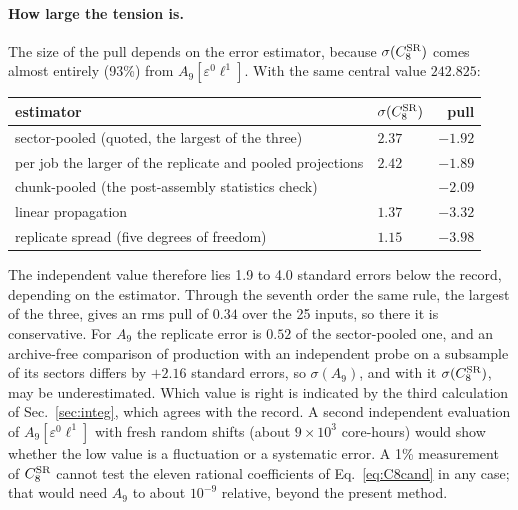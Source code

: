 \documentclass[11pt,a4paper]{article}
\numberwithin{equation}{section}
\newcommand{\CSR}{C^{\rm SR}}
\newcommand{\sci}[2]{#1\times10^{#2}}
\begin{document}
\paragraph{How large the tension is.} The size of the pull depends on the error estimator, because $\sigma(\CSR_8)$
comes almost entirely (93\%) from $A_9[\varepsilon^0\ell^1]$. With the same central value $242.825$:
\begin{center}\small
\begin{tabular}{@{}llr@{}}
\toprule
estimator & $\sigma(\CSR_8)$ & pull\\
\midrule
sector-pooled (quoted, the largest of the three) & $2.37$ & $-1.92$\\
per job the larger of the replicate and pooled projections & $2.42$ & $-1.89$\\
chunk-pooled (the post-assembly statistics check) & & $-2.09$\\
linear propagation & $1.37$ & $-3.32$\\
replicate spread (five degrees of freedom) & $1.15$ & $-3.98$\\
\bottomrule
\end{tabular}
\end{center}
The independent value therefore lies 1.9 to 4.0 standard errors below the record, depending on the estimator. Through
the seventh order the same rule, the largest of the three, gives an rms pull of $0.34$ over the 25 inputs, so there it
is conservative. For $A_9$ the replicate error is $0.52$ of the sector-pooled one, and an archive-free comparison of
production with an independent probe on a subsample of its sectors differs by $+2.16$ standard errors, so
$\sigma(A_9)$, and with it $\sigma(\CSR_8)$, may be underestimated. Which value is right is indicated by the third
calculation of Sec.~\ref{sec:integ}, which agrees with the record. A second independent evaluation of
$A_9[\varepsilon^0\ell^1]$ with fresh random shifts (about $\sci{9}{3}$ core-hours) would show whether the low value
is a fluctuation or a systematic error. A 1\%
measurement of $\CSR_8$ cannot test the eleven rational coefficients of Eq.~\eqref{eq:C8cand} in any case; that would
need $A_9$ to about $10^{-9}$ relative, beyond the present method.
\end{document}

